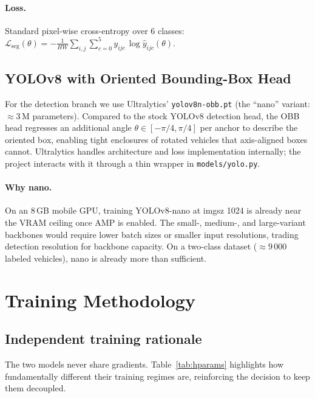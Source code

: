 \documentclass[11pt,a4paper]{article}
\begin{document}
\paragraph{Loss.} Standard pixel-wise cross-entropy over 6 classes:
$
\mathcal{L}_{\text{seg}}(\theta) = -\frac{1}{HW}\sum_{i,j}\sum_{c=0}^{5} y_{ijc}\,\log \hat{y}_{ijc}(\theta).
$

\subsection{YOLOv8 with Oriented Bounding-Box Head}

For the detection branch we use Ultralytics' \texttt{yolov8n-obb.pt} (the ``nano''
variant: $\approx 3$\,M parameters). Compared to the stock YOLOv8 detection head,
the OBB head regresses an additional angle $\theta \in [-\pi/4,\pi/4]$ per anchor
to describe the oriented box, enabling tight enclosures of rotated vehicles that
axis-aligned boxes cannot. Ultralytics handles architecture and loss implementation
internally; the project interacts with it through a thin wrapper in
\texttt{models/yolo.py}.

\paragraph{Why nano.} On an 8\,GB mobile GPU, training YOLOv8-nano at imgsz 1024
is already near the VRAM ceiling once AMP is enabled. The small-, medium-, and
large-variant backbones would require lower batch sizes or smaller input resolutions,
trading detection resolution for backbone capacity. On a two-class dataset
($\approx 9\,000$ labeled vehicles), nano is already more than sufficient.

\section{Training Methodology}

\subsection{Independent training rationale}

The two models never share gradients. Table~\ref{tab:hparams} highlights how
fundamentally different their training regimes are, reinforcing the decision to
keep them decoupled.
\end{document}
